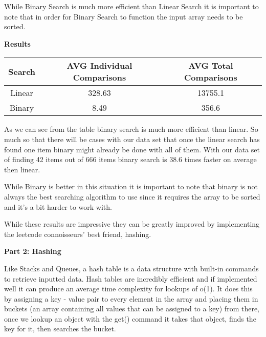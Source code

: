 \documentclass[12pt,letterpaper, onecolumn]{exam}
\begin{document}
\vspace{.5cm}
\centering While Binary Search is much more efficient than Linear Search it is important to note that in order for Binary Search to function the input array needs to be sorted.

\newpage

\centering \textbf{Results}

\vspace{1.5cm}


\begin{tabular}{|c|c|c|}
    \hline
          \textbf{Search} & \textbf{AVG Individual Comparisons} & \textbf{AVG Total Comparisons} \\
          \hline
         Linear  & 328.63 & 13755.1 \\
         Binary  & 8.49 & 356.6 \\
         
    \hline
    \end{tabular}

\vspace{.8cm}

\centering As we can see from the table binary search is much more efficient than linear. So much so that there will be cases with our data set that once the linear search has found one item binary might already be done with all of them. With our data set of finding 42 items out of 666 items binary search is 38.6 times faster on average then linear. 

\vspace{.4cm}

\centering While Binary is better in this situation it is important to note that binary is not always the best searching algorithm to use since it requires the array to be sorted and it's a bit harder to work with. 

\vspace{2cm}

\centering While these results are impressive they can be greatly improved by implementing the leetcode connoisseurs' best friend, hashing.

\newpage

\centering \textbf{Part 2: Hashing}

\vspace{.2cm}
\centering Like Stacks and Queues, a hash table is a data structure with built-in commands to retrieve inputted data. Hash tables are incredibly efficient and if implemented well it can produce an average time complexity for lookups of o(1). It does this by assigning a key - value pair to every element in the array and placing them in buckets (an array containing all values that can be assigned to a key) from there, once we lookup an object with the get() command it takes that object, finds the key for it, then searches the bucket.
\end{document}
